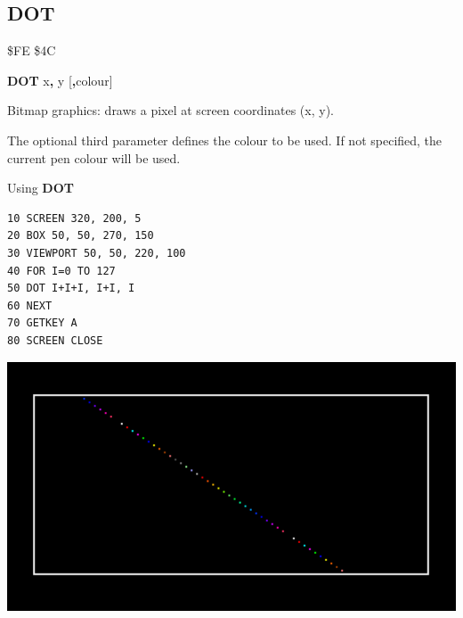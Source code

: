 
\newpage
\subsection{DOT}
\begin{description}[leftmargin=2cm,style=nextline]
\item [Token:]    \$FE \$4C
\item [Format:]   {\bf DOT} x{\bf,} y [{\bf,}colour]
\item [Usage:]    Bitmap graphics: draws a pixel at screen coordinates (x, y).

                  The optional third parameter defines the colour to be used. If not specified, the current pen colour will be used.

\item [Example:]  Using {\bf DOT}

\begin{tcolorbox}[colback=black,coltext=white]
\verbatimfont{\codefont}
\begin{verbatim}
10 SCREEN 320, 200, 5
20 BOX 50, 50, 270, 150
30 VIEWPORT 50, 50, 220, 100
40 FOR I=0 TO 127
50 DOT I+I+I, I+I, I
60 NEXT
70 GETKEY A
80 SCREEN CLOSE
\end{verbatim}
\end{tcolorbox}

\item \begin{center}\includegraphics[width=0.7\linewidth]{images/dot.png}\end{center}
\end{description}


\newpage
